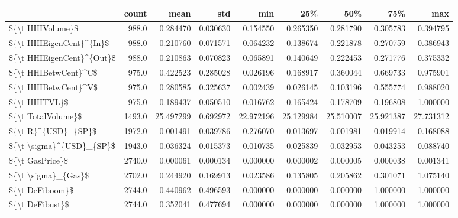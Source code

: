 \begin{tabular}{lrrrrrrrr}
\toprule
{} &   count &       mean &       std &        min &        25\% &        50\% &        75\% &        max \\
\midrule
\$\{\textbackslash t HHIVolume\}\$          &   988.0 &   0.284470 &  0.030630 &   0.154550 &   0.265350 &   0.281790 &   0.305783 &   0.394795 \\
\$\{\textbackslash t HHIEigenCent\}\textasciicircum \{In\}\$  &   988.0 &   0.210760 &  0.071571 &   0.064232 &   0.138674 &   0.221878 &   0.270759 &   0.386943 \\
\$\{\textbackslash t HHIEigenCent\}\textasciicircum \{Out\}\$ &   988.0 &   0.210863 &  0.070823 &   0.065891 &   0.140649 &   0.222453 &   0.271776 &   0.375332 \\
\$\{\textbackslash t HHIBetwCent\}\textasciicircum C\$      &   975.0 &   0.422523 &  0.285028 &   0.026196 &   0.168917 &   0.360044 &   0.669733 &   0.975901 \\
\$\{\textbackslash t HHIBetwCent\}\textasciicircum V\$      &   975.0 &   0.280585 &  0.325637 &   0.002439 &   0.026145 &   0.103196 &   0.555774 &   0.988020 \\
\$\{\textbackslash t HHITVL\}\$             &   975.0 &   0.189437 &  0.050510 &   0.016762 &   0.165424 &   0.178709 &   0.196808 &   1.000000 \\
\$\{\textbackslash t TotalVolume\}\$        &  1493.0 &  25.497299 &  0.692972 &  22.972196 &  25.129984 &  25.510007 &  25.921387 &  27.731312 \\
\$\{\textbackslash t R\}\textasciicircum \{USD\}\_\{SP\}\$       &  1972.0 &   0.001491 &  0.039786 &  -0.276070 &  -0.013697 &   0.001981 &   0.019914 &   0.168088 \\
\$\{\textbackslash t \textbackslash sigma\}\textasciicircum \{USD\}\_\{SP\}\$  &  1943.0 &   0.036324 &  0.015373 &   0.010735 &   0.025839 &   0.032953 &   0.043253 &   0.088740 \\
\$\{\textbackslash t GasPrice\}\$           &  2740.0 &   0.000061 &  0.000134 &   0.000000 &   0.000002 &   0.000005 &   0.000038 &   0.001341 \\
\$\{\textbackslash t \textbackslash sigma\}\_\{Gas\}\$       &  2702.0 &   0.244920 &  0.169913 &   0.023586 &   0.135805 &   0.205862 &   0.301071 &   1.075140 \\
\$\{\textbackslash t DeFiboom\}\$           &  2744.0 &   0.440962 &  0.496593 &   0.000000 &   0.000000 &   0.000000 &   1.000000 &   1.000000 \\
\$\{\textbackslash t DeFibust\}\$           &  2744.0 &   0.352041 &  0.477694 &   0.000000 &   0.000000 &   0.000000 &   1.000000 &   1.000000 \\
\bottomrule
\end{tabular}
